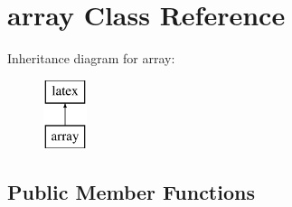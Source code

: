 \hypertarget{classarray}{\section{array Class Reference}
\label{classarray}
}
Inheritance diagram for array\-:\begin{figure}[H]
\begin{center}
\leavevmode
\includegraphics[height=2.000000cm]{classarray}
\end{center}
\end{figure}
\subsection*{Public Member Functions}
